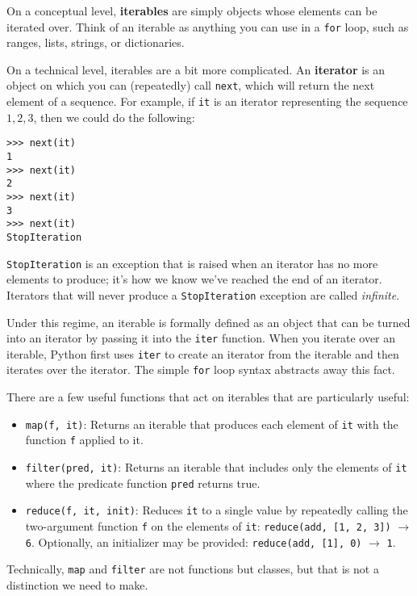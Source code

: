 On a conceptual level, \textbf{iterables} are simply objects whose elements can be iterated over. Think of an iterable as anything you can use in a \lstinline{for} loop, such as ranges, lists, strings, or dictionaries.

On a technical level, iterables are a bit more complicated. An \textbf{iterator} is an object on which you can (repeatedly) call \lstinline{next}, which will return the next element of a sequence. For example, if \lstinline{it} is an iterator representing the sequence $1, 2, 3$, then we could do the following: 
\begin{lstlisting}
>>> next(it)
1
>>> next(it)
2
>>> next(it)
3
>>> next(it)
StopIteration
\end{lstlisting}

\lstinline{StopIteration} is an exception that is raised when an iterator has no more elements to produce; it's how we know we've reached the end of an iterator. Iterators that will never produce a \lstinline{StopIteration} exception are called \textit{infinite}. 

Under this regime, an iterable is formally defined as an object that can be turned into an iterator by passing it into the \lstinline{iter} function. When you iterate over an iterable, Python first uses \lstinline{iter} to create an iterator from the iterable and then iterates over the iterator. The simple \lstinline{for} loop syntax abstracts away this fact. 

There are a few useful functions that act on iterables that are particularly useful: 
\begin{itemize}
    \item \lstinline{map(f, it)}: Returns an iterable that produces each element of \lstinline{it} with the function \lstinline{f} applied to it.
    \item \lstinline{filter(pred, it)}: Returns an iterable that includes only the elements of \lstinline{it} where the predicate function \lstinline{pred} returns true. 
    \item \lstinline{reduce(f, it, init)}: Reduces \lstinline{it} to a single value by repeatedly calling the two-argument function \lstinline{f} on the elements of \lstinline{it}: \lstinline{reduce(add, [1, 2, 3])} $\rightarrow$ \lstinline{6}. Optionally, an initializer may be provided: \lstinline{reduce(add, [1], 0)} $\rightarrow$ \lstinline{1}. 
\end{itemize}

\begin{meta}
Technically, \lstinline{map} and \lstinline{filter} are not functions but classes, but that is not a distinction we need to make. 
\end{meta}

